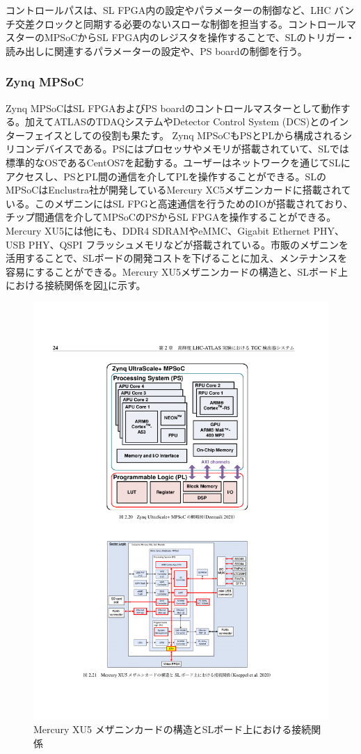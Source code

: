 コントロールパスは、SL FPGA内の設定やパラメーターの制御など、LHC バンチ交差クロックと同期する必要のないスローな制御を担当する。コントロールマスターのMPSoCからSL FPGA内のレジスタを操作することで、SLのトリガー・読み出しに関連するパラメーターの設定や、PS boardの制御を行う。

    \subsubsection*{Zynq MPSoC}
Zynq MPSoCはSL FPGAおよびPS boardのコントロールマスターとして動作する。加えてATLASのTDAQシステムやDetector Control System (DCS)とのインターフェイスとしての役割も果たす。
Zynq MPSoCもPSとPLから構成されるシリコンデバイスである。PSにはプロセッサやメモリが搭載されていて、SLでは標準的なOSであるCentOS7を起動する。ユーザーはネットワークを通じてSLにアクセスし、PSとPL間の通信を介してPLを操作することができる。SLのMPSoCはEnclustra社が開発しているMercury XC5メザニンカードに搭載されている。このメザニンにはSL FPGと高速通信を行うためのIOが搭載されており、チップ間通信を介してMPSoCのPSからSL FPGAを操作することができる。
Mercury XU5には他にも、DDR4 SDRAMやeMMC、Gigabit Ethernet PHY、USB PHY、QSPI フラッシュメモリなどが搭載されている。市販のメザニンを活用することで、SLボードの開発コストを下げることに加え、メンテナンスを容易にすることができる。Mercury XU5メザニンカードの構造と、SLボード上における接続関係を図\ref{SL_mezanin}に示す。

\begin{figure} 
\centering
\includegraphics[width=16cm]{fig/Intro/SL_mezanin.pdf}
\caption[Mercury XU5 メザニンカードの構造とSLボード上における接続関係]{Mercury XU5 メザニンカードの構造とSLボード上における接続関係\cite{mt_mishima}}
\label{SL_mezanin}
\end{figure}